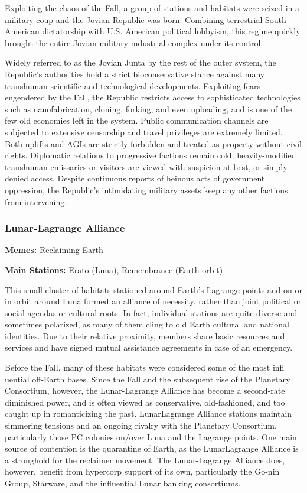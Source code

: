 Exploiting the chaos of the Fall, a group of stations and habitats
were seized in a military coup and the Jovian Republic was
born. Combining terrestrial South American dictatorship with
U.S. American political lobbyism, this regime quickly brought the
entire Jovian military-industrial complex under its control.

Widely referred to as the Jovian Junta by the rest of the outer
system, the Republic's authorities hold a strict bioconservative
stance against many transhuman scientific and technological
developments. Exploiting fears engendered by the Fall, the Republic
restricts access to sophisticated technologies such as
nanofabrication, cloning, forking, and even uploading, and is one of
the few old economies left in the system. Public communication
channels are subjected to extensive censorship and travel privileges
are extremely limited. Both uplifts and AGIs are strictly forbidden
and treated as property without civil rights. Diplomatic relations to
progressive factions remain cold; heavily-modified transhuman
emissaries or visitors are viewed with suspicion at best, or simply
denied access. Despite continuous reports of heinous acts of
government oppression, the Republic's intimidating military assets
keep any other factions from intervening.

\subsubsection{Lunar-Lagrange Alliance}
\label{sec:lunar-lagr-alli}

\textbf{Memes:} Reclaiming Earth

\textbf{Main Stations:} Erato (Luna), Remembrance (Earth orbit)


This small cluster of habitats stationed around Earth's Lagrange
points and on or in orbit around Luna formed an alliance of necessity,
rather than joint political or social agendas or cultural roots. In
fact, individual stations are quite diverse and sometimes polarized,
as many of them cling to old Earth cultural and national
identities. Due to their relative proximity, members share basic
resources and services and have signed mutual assistance agreements in
case of an emergency.

Before the Fall, many of these habitats were considered some of the
most infl uential off-Earth bases.  Since the Fall and the subsequent
rise of the Planetary Consortium, however, the Lunar-Lagrange Alliance
has become a second-rate diminished power, and is often viewed as
conservative, old-fashioned, and too caught up in romanticizing the
past. LunarLagrange Alliance stations maintain simmering tensions and
an ongoing rivalry with the Planetary Consortium, particularly those
PC colonies on/over Luna and the Lagrange points. One main source of
contention is the quarantine of Earth, as the LunarLagrange Alliance
is a stronghold for the reclaimer movement. The Lunar-Lagrange
Alliance does, however, benefit from hypercorp support of its own,
particularly the Go-nin Group, Starware, and the influential Lunar
banking consortiums.

